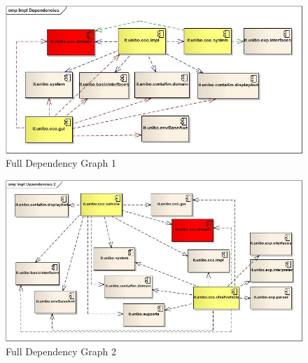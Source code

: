 \documentclass{llncs}
\newcommand{\labelsec}[1]{\label{sec:#1}}
\newcommand{\labelfig}[1]{\label{fig:#1}}
\begin{document}
\begin{figure}
   \centering
   \includegraphics[scale = 0.42]{../Diagrams/Deploy_FullDep1.jpg}
  \caption{Full Dependency Graph 1}\labelfig{testTypes}
\end{figure}
\begin{figure}
   \centering
   \includegraphics[scale = 0.42]{../Diagrams/Deploy_FullDep2.jpg}
  \caption{Full Dependency Graph 2}\labelfig{testTypes}
\end{figure}

\end{document}
